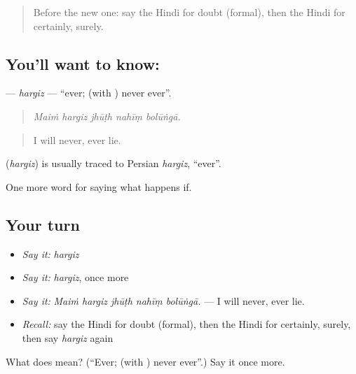 \begin{quote}
Before the new one: say the Hindi for doubt (formal), then the Hindi for certainly, surely.
\end{quote}

\subsection*{You'll want to know: }
\textbf{} — \emph{hargiz} — \textquotedblleft{}ever; (with ) never ever\textquotedblright{}.

\begin{quote}
    
\end{quote}

\begin{quote}
\emph{Maiṁ hargiz jhūṭh nahīṃ bolūṅgā.}
\end{quote}

\begin{quote}
I will never, ever lie.
\end{quote}

\begin{cousinweb}
\textbf{} (\emph{hargiz}) is usually traced to Persian \emph{hargiz}, \textquotedblleft{}ever\textquotedblright{}.
\end{cousinweb}

\begin{grammarlens}[title={What you've built}]
One more word for saying what happens if.
\end{grammarlens}

\subsection*{Your turn}
\begin{itemize}
\raggedright
  \item \emph{Say it:} \emph{hargiz}
  \item \emph{Say it:} \emph{hargiz}, once more
  \item \emph{Say it:} \emph{Maiṁ hargiz jhūṭh nahīṃ bolūṅgā.} — I will never, ever lie.
  \item \emph{Recall:} say the Hindi for doubt (formal), then the Hindi for certainly, surely, then say \emph{hargiz} again
\end{itemize}

\begin{tcolorbox}[breakable,colback=teal!4,colframe=teal!35!black,title={Before you move on}]
What does  mean? (\textquotedblleft{}Ever; (with ) never ever\textquotedblright{}.) Say it once more.
\end{tcolorbox}
